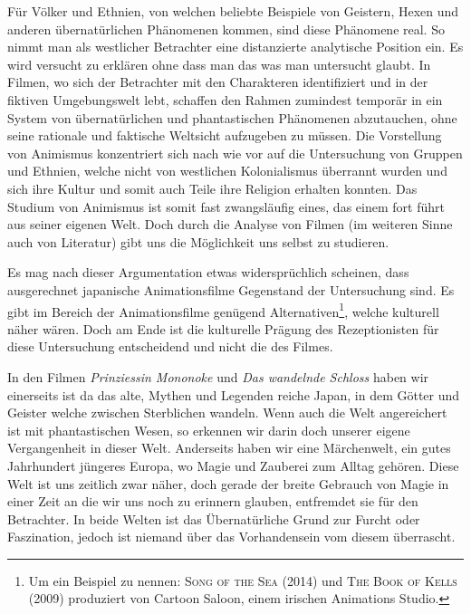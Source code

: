 Für Völker und Ethnien, von welchen beliebte Beispiele von Geistern, Hexen und anderen übernatürlichen Phänomenen kommen, sind diese Phänomene real. So nimmt man als westlicher Betrachter eine distanzierte analytische Position ein. Es wird versucht zu erklären ohne dass man das was man untersucht glaubt. In Filmen, wo sich der Betrachter mit den Charakteren identifiziert und in der fiktiven Umgebungswelt lebt, schaffen den Rahmen zumindest temporär in ein System von übernatürlichen und phantastischen Phänomenen abzutauchen, ohne seine rationale und faktische Weltsicht aufzugeben zu müssen. Die Vorstellung von Animismus konzentriert sich nach wie vor auf die Untersuchung von Gruppen und Ethnien, welche nicht von westlichen Kolonialismus überrannt wurden und sich ihre Kultur und somit auch Teile ihre Religion erhalten konnten. Das Studium von Animismus ist somit fast zwangsläufig eines, das einem fort führt aus seiner eigenen Welt. Doch durch die Analyse von Filmen (im weiteren Sinne auch von Literatur) gibt uns die Möglichkeit uns selbst zu studieren.

Es mag nach dieser Argumentation etwas widersprüchlich scheinen, dass ausgerechnet japanische Animationsfilme Gegenstand der Untersuchung sind. Es gibt im Bereich der Animationsfilme genügend Alternativen\footnote{Um ein Beispiel zu nennen: \textsc{Song of the Sea} (2014) und \textsc{The Book of Kells} (2009) produziert von Cartoon Saloon, einem irischen Animations Studio.}, welche kulturell näher wären. Doch am Ende ist die kulturelle Prägung des Rezeptionisten für diese Untersuchung entscheidend und nicht die des Filmes.

In den Filmen \emph{Prinziessin Mononoke} und \emph{Das wandelnde Schloss} haben wir einerseits ist da das alte, Mythen und Legenden reiche Japan, in dem Götter und Geister welche zwischen Sterblichen wandeln. Wenn auch die Welt angereichert ist mit phantastischen Wesen, so erkennen wir darin doch unserer eigene Vergangenheit in dieser Welt. Anderseits haben wir eine Märchenwelt, ein gutes Jahrhundert jüngeres Europa, wo Magie und Zauberei zum Alltag gehören. Diese Welt ist uns zeitlich zwar näher, doch gerade der breite Gebrauch von Magie in einer Zeit an die wir uns noch zu erinnern glauben, entfremdet sie für den Betrachter. In beide Welten ist das Übernatürliche Grund zur Furcht oder Faszination, jedoch ist niemand über das Vorhandensein vom diesem überrascht. \par

